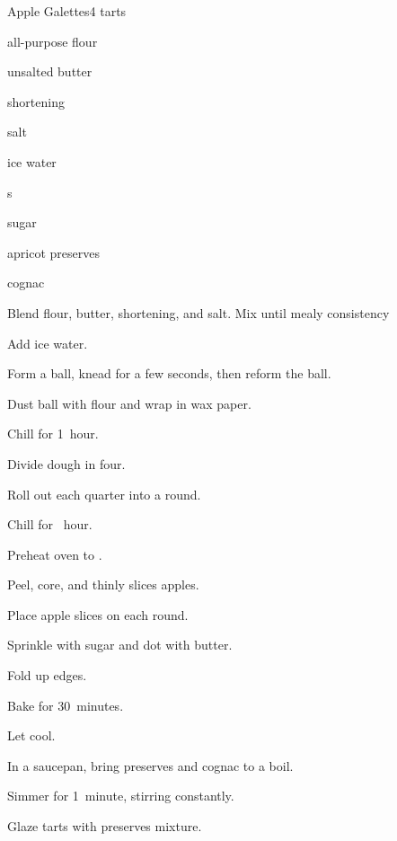 \begin{recipe}{Apple Galettes}{}{4 tarts}

\begin{ingredients}
\item \C{1\quarter} all-purpose flour
\item {} unsalted butter
\item {} shortening
\item \tp{\quarter} salt
\item {} ice water
\item {}s
\item sugar
\item \C{\half} apricot preserves
\item {} cognac
\end{ingredients}

\begin{directions}
\item Blend flour, butter, shortening, and salt. Mix until mealy consistency
\item Add ice water.
\item Form a ball, knead for a few seconds, then reform the ball.
\item Dust ball with flour and wrap in wax paper.
\item Chill for 1~hour.
\item Divide dough in four.
\item Roll out each quarter into a  round.
\item Chill for \half~hour.
\item Preheat oven to .
\item Peel, core, and thinly slices apples.
\item Place apple slices on each round.
\item Sprinkle with sugar and dot with butter.
\item Fold up edges.
\item Bake for 30~minutes.
\item Let cool.
\item In a saucepan, bring preserves and cognac to a boil.
\item Simmer for 1~minute, stirring constantly.
\item Glaze tarts with preserves mixture.
\end{directions}

\end{recipe}
